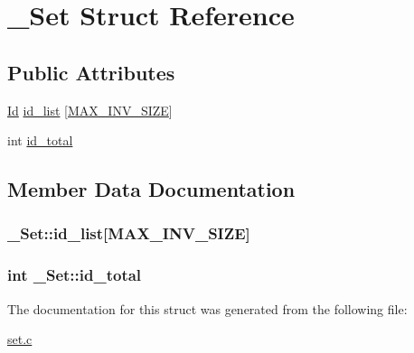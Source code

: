\hypertarget{struct__Set}{}\section{\+\_\+\+Set Struct Reference}
\label{struct__Set}
\subsection*{Public Attributes}
\begin{DoxyCompactItemize}
\item 
\hyperlink{types_8h_a845e604fb28f7e3d97549da3448149d3}{Id} \hyperlink{struct__Set_adde563bd36bf2d00bd5a49b493c4f3bb}{id\+\_\+list} \mbox{[}\hyperlink{set_8h_af6e65f998f2940aaf745740214a3facf}{M\+A\+X\+\_\+\+I\+N\+V\+\_\+\+S\+I\+ZE}\mbox{]}
\item 
int \hyperlink{struct__Set_afe941cf156f1000d962bff58835ba853}{id\+\_\+total}
\end{DoxyCompactItemize}


\subsection{Member Data Documentation}
\subsubsection[{\texorpdfstring{id\+\_\+list}{id_list}}]{ \+\_\+\+Set\+::id\+\_\+list\mbox{[}{\bf M\+A\+X\+\_\+\+I\+N\+V\+\_\+\+S\+I\+ZE}\mbox{]}}\hypertarget{struct__Set_adde563bd36bf2d00bd5a49b493c4f3bb}{}\label{struct__Set_adde563bd36bf2d00bd5a49b493c4f3bb}
\subsubsection[{\texorpdfstring{id\+\_\+total}{id_total}}]{\setlength{\rightskip}{0pt plus 5cm}int \+\_\+\+Set\+::id\+\_\+total}\hypertarget{struct__Set_afe941cf156f1000d962bff58835ba853}{}\label{struct__Set_afe941cf156f1000d962bff58835ba853}


The documentation for this struct was generated from the following file\+:\begin{DoxyCompactItemize}
\item 
\hyperlink{set_8c}{set.\+c}\end{DoxyCompactItemize}
